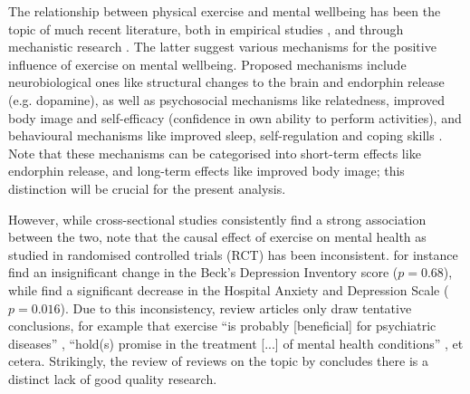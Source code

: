 The relationship between physical exercise and mental wellbeing has been the topic of much recent literature,
both in empirical studies \cite{noetel2024effect, mahindru2023role}, and through mechanistic research \cite{smith2021role, lubans2016physical}.
The latter suggest various mechanisms for the positive influence of exercise on mental wellbeing.
Proposed mechanisms include neurobiological ones like structural changes to the brain and endorphin release (e.g. dopamine),
as well as psychosocial mechanisms like relatedness, improved body image and self-efficacy (confidence in own ability to perform activities),
and behavioural mechanisms like improved sleep, self-regulation and coping skills \cite{lubans2016physical}.
Note that these mechanisms can be categorised into short-term effects like endorphin release, and long-term effects
like improved body image; this distinction will be crucial for the present analysis.

However, while cross-sectional studies consistently find a strong association between the two, 
note that the causal effect of exercise on mental health as studied in randomised controlled trials (RCT) has been inconsistent.
 for instance find an insignificant change in the Beck's Depression Inventory score
($p = 0.68$), while  find a significant decrease in the Hospital Anxiety and
Depression Scale ($p = 0.016$).
Due to this inconsistency, review articles only draw tentative conclusions, for example that exercise ``is probably [beneficial]
for psychiatric diseases'' \cite{peluso2005physical}, ``hold(s) promise in the treatment [...] of mental health conditions''
\cite{smith2021role}, et cetera.
Strikingly, the review of reviews on the topic by  concludes there is a distinct lack of good quality research.

